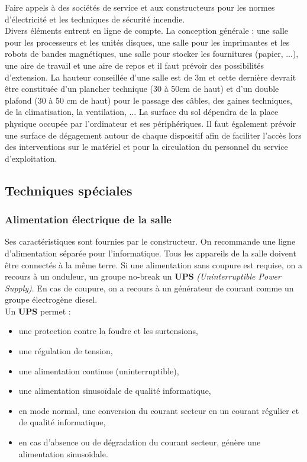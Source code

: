 \documentclass[10pt,a4paper,oneside,titlepage]{report}
\newcommand{\titre}[1]{\textcolor{title}{#1}}
\newcommand{\strong}[1]{\textbf{\titre{#1}}}
\begin{document}
Faire appels à des sociétés de service et aux constructeurs pour les normes d'électricité et les techniques de sécurité incendie.\\
Divers éléments entrent en ligne de compte. La conception générale : une salle pour les processeurs et les unités disques, une salle pour les imprimantes et les robots de bandes magnétiques, une salle pour stocker les fournitures (papier, ...), une
aire de travail et une aire de repos et il faut prévoir des possibilités d'extension. La hauteur conseillée d'une salle est de 3m et cette dernière devrait \^etre constituée d'un plancher technique (30 à 50cm de haut) et d'un double plafond (30 à 50
cm de haut) pour le passage des c\^ables, des gaines techniques, de la climatisation, la ventilation, ... La surface du sol dépendra de la place physique occupée par l'ordinateur et ses périphériques. Il faut également prévoir une surface de
dégagement autour de chaque dispositif afin de faciliter l'accès lors des interventions sur le matériel et pour la circulation du personnel du service d'exploitation.

\subsection{Techniques spéciales}

\subsubsection{Alimentation électrique de la salle}

Ses caractéristiques sont fournies par le constructeur. On recommande une ligne d'alimentation séparée pour l'informatique. Tous les appareils de la salle doivent \^etre connectés à la m\^eme terre. Si une alimentation sans coupure est requise, on a
recours à un onduleur, un groupe no-break un \strong{UPS} \textit{(Uninterruptible Power Supply)}. En cas de coupure, on a recours à un générateur de courant comme un groupe électrogène diesel.\\

Un \textbf{UPS} permet :\begin{itemize}
\item une protection contre la foudre et les surtensions,
\item une régulation de tension,
\item une alimentation continue (uninterruptible),
\item une alimentation sinusoïdale de qualité informatique,
\item en mode normal, une conversion du courant secteur en un courant régulier et de qualité informatique,
\item en cas d'absence ou de dégradation du courant secteur, génère une alimentation sinusoïdale.
\end{itemize}
\end{document}
